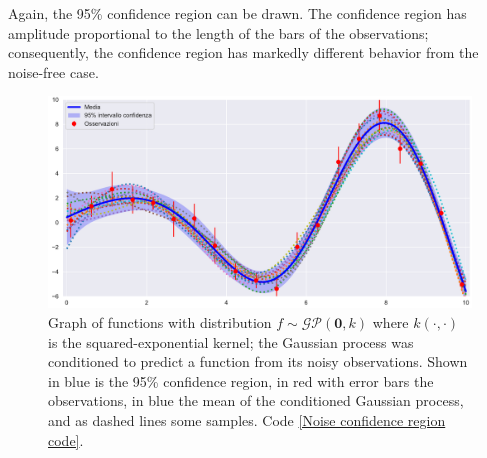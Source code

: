 Again, the 95\% confidence region can be drawn. The confidence region has amplitude proportional to the length of the bars of the observations; consequently, the confidence region has markedly different behavior from the noise-free case.

\begin{figure}[h]
    \centering
    \includegraphics[width=1\textwidth]{images/Gaussian process/Noise - mean&samples.pdf}
    \caption{Graph of functions with distribution $f\sim \mathcal{GP}(\bm{0},k)$ where $k(\cdot,\cdot)$ is the squared-exponential kernel; the Gaussian process was conditioned to predict a function from its noisy observations. Shown in blue is the 95\% confidence region, in red with error bars the observations, in blue the mean of the conditioned Gaussian process, and as dashed lines some samples. Code \ref{Noise confidence region code}.}
    \label{Noisy confidence region}
\end{figure}